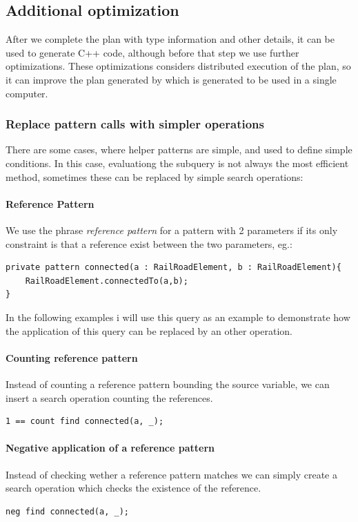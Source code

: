 \subsection{Additional optimization}

After we complete the plan with type information and other details, it can be used to generate C++ code, although before that step we use further optimizations. 
These optimizations considers distributed execution of the plan, so it can improve the plan generated by \viatra{} which is generated to be used in a single computer.


\subsubsection{Replace pattern calls with simpler operations}
There are some cases, where helper patterns are simple, and used to define simple conditions. 
In this case, evaluationg the subquery is not always the most efficient method, sometimes these can be replaced by simple search operations:

\paragraph{Reference Pattern}
We use the phrase \emph{reference pattern} for a pattern with 2 parameters if its only constraint is that a reference exist between the two parameters, eg.:
\begin{lstlisting}[language = vql]
private pattern connected(a : RailRoadElement, b : RailRoadElement){
	RailRoadElement.connectedTo(a,b);
}
\end{lstlisting}

In the following examples i will use this query as an example to demonstrate how the application of this query can be replaced by an other operation.

\paragraph{Counting reference pattern} 
Instead of counting a reference pattern bounding the source variable, we can insert a search operation counting the references.

\begin{lstlisting}[language = vql]
1 == count find connected(a, _);
\end{lstlisting}


\paragraph{Negative application of a reference pattern}
Instead of checking wether a reference pattern matches we can simply create a search operation which checks the existence of the reference.
\begin{lstlisting}[language = vql]
neg find connected(a, _);
\end{lstlisting}

